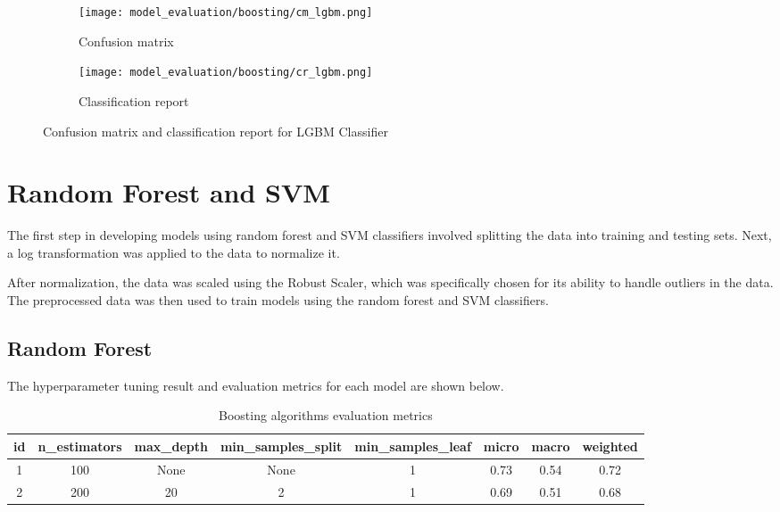 \begin{figure}[H]
    \centering
    \begin{subfigure}[b]{0.5\textwidth}
        \texttt{[image: model\_evaluation/boosting/cm\_lgbm.png]}
        \caption{Confusion matrix}
    \end{subfigure}
    \hfill
    \begin{subfigure}[b]{0.4\textwidth}
        \texttt{[image: model\_evaluation/boosting/cr\_lgbm.png]}
        \caption{Classification report}
    \end{subfigure}
    \caption{Confusion matrix and classification report for LGBM Classifier}
\end{figure}

\section{Random Forest and SVM}
The first step in developing models using random forest and SVM classifiers involved splitting the data into training and testing sets. Next, a log transformation was applied to the data to normalize it.

After normalization, the data was scaled using the Robust Scaler, which was specifically chosen for its ability to handle outliers in the data. The preprocessed data was then used to train models using the random forest and SVM classifiers.


\subsection{Random Forest}
The hyperparameter tuning result and evaluation metrics for each model are shown below.

\begin{table}[H]
    \begin{center}
        \begin{tabular}{ |c|c|c|c|c|c|c|c| }
            \hline
            id & n\_estimators & max\_depth & min\_samples\_split & min\_samples\_leaf  & micro & macro & weighted \\
            \hline
            1 & 100 & None  & None  & 1 & 0.73  & 0.54  & 0.72     \\
            \hline        
            2 & 200 & 20  & 2  & 1 & 0.69  & 0.51  & 0.68     \\
            \hline
        \end{tabular}
    \end{center}
    \caption{Boosting algorithms evaluation metrics}
\end{table}

